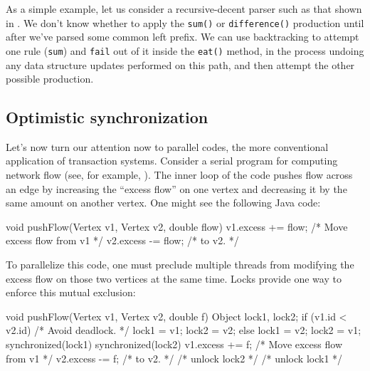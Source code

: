 As a simple example, let us consider a recursive-decent parser such as
that shown in .  We don't know whether to
apply the \texttt{sum()} or \texttt{difference()} production until
after we've parsed some common left prefix.  We can use backtracking
to attempt one rule (\texttt{sum}) and \texttt{fail} out of it
inside the \texttt{eat()} method, in the process undoing any data
structure updates performed on this path, and then attempt the other
possible production.

\subsection{Optimistic synchronization}\label{sec:flow}

Let's now turn our attention now to parallel codes, the more
conventional application of transaction systems.
Consider a serial program for computing network flow (see, for
example, \cite[Chapter 26]{CormenLeRi01}).  The inner loop of the code
pushes flow across an edge by increasing the ``excess flow'' on one
vertex and decreasing it by the same amount on another vertex.  One
might see the following Java code:
\begin{inlinecode}
void pushFlow(Vertex v1, Vertex v2, double flow) {
  v1.excess += flow; /* Move excess flow from v1 */
  v2.excess -= flow; /* to v2.                   */
}
\end{inlinecode}

To parallelize this code, one must preclude multiple threads from
modifying the excess flow on those two vertices at the same time.
Locks provide one way to enforce this mutual exclusion: 
\begin{inlinecode}
void pushFlow(Vertex v1, Vertex v2, double f) {
  Object lock1, lock2;
  if (v1.id < v2.id) {       /* Avoid deadlock. */
    lock1 = v1; lock2 = v2;
  } else {
    lock1 = v2; lock2 = v1;
  }
  synchronized(lock1) {
    synchronized(lock2) {
      v1.excess += f; /* Move excess flow from v1 */
      v2.excess -= f; /* to v2.                   */
    } /* unlock lock2 */
  } /* unlock lock1 */
}
\end{inlinecode}

